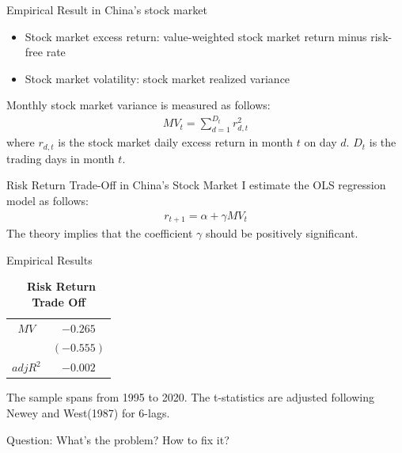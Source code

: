 \documentclass{beamer}
\begin{document}
\begin{frame}{Empirical Result in China's stock market}
	\begin{itemize}
		\item Stock market excess return: value-weighted stock market return minus risk-free rate
		\item Stock market volatility: stock market realized variance
	\end{itemize}

	Monthly stock market variance is measured as follows:
	\begin{align*}
		MV_{t} =\sum_{d=1}^{D_{t}}r_{d,t}^{2}
	\end{align*}
	where $ r_{d,t} $ is  the stock market daily excess return in month $t$ on day $d$. $ D_{t} $ is the trading days in month $t$.
\end{frame}



\begin{frame}{Risk Return Trade-Off in China's Stock Market}
	I estimate the OLS regression model as follows:
	\begin{align*}
		r_{t+1} = \alpha + \gamma MV_{t}
	\end{align*}
	The theory implies that the coefficient $\gamma$ should be positively significant.
\end{frame}

\begin{frame}{Empirical Results}
	\begin{table}[!htbp]
		\centering
		\caption{\ \textbf{Risk Return Trade Off}}
		\begin{tabular}{cc}
			\hline
			$ MV $&$ -0.265 $\\
			& $ (-0.555) $\\
			$ adj R^2 $& $ -0.002 $ \\
			\hline
		\end{tabular}
	\end{table}
	The sample spans from 1995 to 2020. The t-statistics are adjusted following Newey and West(1987) for 6-lags.

	\vspace{10pt}
	Question: What's the problem? How to fix it?
\end{frame}
\end{document}
